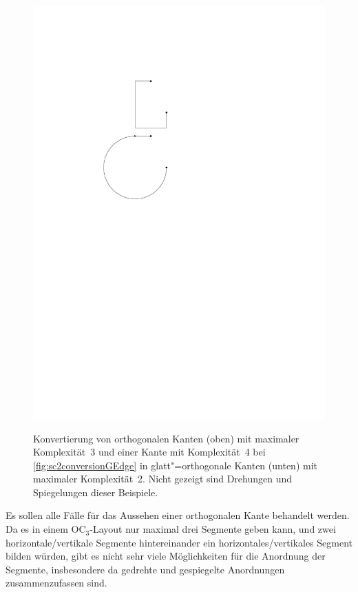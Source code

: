 \documentclass[a4paper]{scrreprt}
\theoremstyle{definition}
\begin{document}
\begin{figure}[h]
            {\includegraphics[scale=.8]{sc2_conversion/GEdge}}
        \quad

        \caption{Konvertierung von orthogonalen Kanten (oben) mit maximaler Komplexität~3 und einer Kante mit Komplexität~4 bei \ref{fig:sc2conversionGEdge} in glatt"=orthogonale Kanten (unten) mit maximaler Komplexität~2. Nicht gezeigt sind Drehungen und Spiegelungen dieser Beispiele.}
        \label{fig:sc2conversion}
\end{figure}

Es sollen alle Fälle für das Aussehen einer orthogonalen Kante behandelt werden. Da es in einem OC$_3$-Layout nur maximal drei Segmente geben kann, und zwei horizontale/vertikale Segmente hintereinander ein horizontales/vertikales Segment bilden würden, gibt es nicht sehr viele Möglichkeiten für die Anordnung der Segmente, insbesondere da gedrehte und gespiegelte Anordnungen zusammenzufassen sind.
\end{document}
